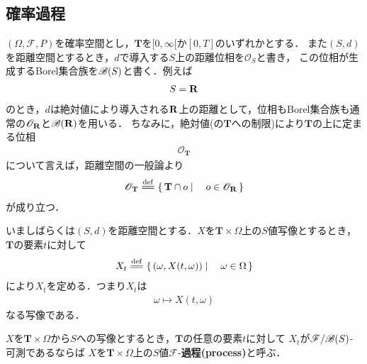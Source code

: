 \subsection{確率過程}
	$(\Omega,\mathscr{F},P)$を確率空間とし，$\mathbf{T}$を$[0,\infty[$か$[0,T]$のいずれかとする．
	また$(S,d)$を距離空間とするとき，$d$で導入する$S$上の距離位相を$\mathscr{O}_{S}$と書き，
	この位相が生成するBorel集合族を$\mathscr{B}(S)$と書く．例えば
	\begin{align}
		S = \mathbf{R}
	\end{align}
	のとき，$d$は絶対値により導入される$\mathbf{R}$上の距離として，位相もBorel集合族も通常の$\mathscr{O}_{\mathbf{R}}$と$\mathscr{B}(\mathbf{R})$を用いる．
	ちなみに，絶対値(の$\mathbf{T}$への制限)により$\mathbf{T}$の上に定まる位相
	\begin{align}
		\mathscr{O}_{\mathbf{T}}
	\end{align}
	について言えば，距離空間の一般論より
	\begin{align}
		\mathscr{O}_{\mathbf{T}} \defeq \Set{\mathbf{T} \cap o}{o \in \mathscr{O}_{\R}}
	\end{align}
	が成り立つ．
	
	いましばらくは$(S,d)$を距離空間とする．$X$を$\mathbf{T} \times \Omega$上の$S$値写像とするとき，
	$\mathbf{T}$の要素$t$に対して
	\begin{align}
		X_t \defeq \Set{(\omega,X(t,\omega))}{\omega \in \Omega}
	\end{align}
	により$X_t$を定める．つまり$X_t$は
	\begin{align}
		\omega \longmapsto X(t,\omega)
	\end{align}
	なる写像である．
	
	\begin{screen}
		\begin{dfn}[確率過程]
			$Xを$$\mathbf{T} \times \Omega$から$S$への写像とするとき，$\mathbf{T}$の任意の要素$t$に対して
			$X_t$が$\mathscr{F}/\mathscr{B}(S)$-可測であるならば
			$X$を$\mathbf{T} \times \Omega$上の$S$値$\mathscr{F}$-{\bf 過程}{\bf (process)}と呼ぶ．
		\end{dfn}
	\end{screen}
	
